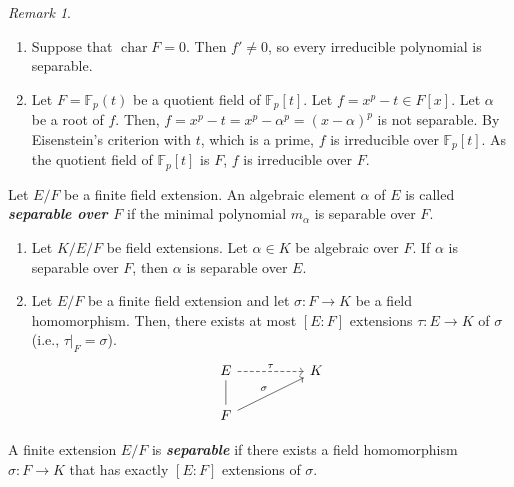 \documentclass[twoside]{article}
\DeclareMathOperator\Char{char}
\newcommand\F{\mathbb F}
\theoremstyle{remark}
\newtheorem*{remark}{{Remark}}
\newcounter{theorem}
\newcommand*\term[1]{\textbf{\textit{\mathversion{bold}#1}}}
\begin{document}
\begin{remark}
  \begin{enumerate}[label=(\arabic*)]
    \item Suppose that \(\Char F = 0\). Then \(f' \neq 0\), so every irreducible polynomial is separable.
    \item Let \(F = \F_p(t)\) be a quotient field of \(\F_p[t]\). Let \(f = x^p-t \in F[x]\). Let \(\alpha\) be a root of \(f\). Then, \(f = x^p - t = x^p - \alpha^p = (x-\alpha)^p\) is not separable. By Eisenstein's criterion with \(t\), which is a prime, \(f\) is irreducible over \(\F_p[t]\). As the quotient field of \(\F_p[t]\) is \(F\), \(f\) is irreducible over \(F\).
  \end{enumerate}
\end{remark}

\begin{definition}
  Let \(E/F\) be a finite field extension. An algebraic element \(\alpha\) of \(E\) is called \term{separable over \(F\)} if the minimal polynomial \(m_\alpha\) is separable over \(F\).
\end{definition}

\begin{lemma}
  \begin{enumerate}[label=\textup{(\arabic*)}, nosep]
    \item Let \(K/E/F\) be field extensions. Let \(\alpha \in K\) be algebraic over \(F\). If \(\alpha\) is separable over \(F\), then \(\alpha\) is separable over \(E\).
    \item Let \(E/F\) be a finite field extension and let \(\sigma\colon F \to K\) be a field homomorphism. Then, there exists at most \([E:F]\) extensions \(\tau\colon E \to K\) of \(\sigma\) (i.e., \(\tau|_F = \sigma\)).
    \begin{displaymath}
      \begin{tikzcd}[column sep=huge]
        E\rar[dashed,"\tau"]\dar[dash] & K \\
        F\arrow[ur,"\sigma"]
      \end{tikzcd}
    \end{displaymath}
  \end{enumerate}
\end{lemma}

\begin{definition}
  A finite extension \(E/F\) is \term{separable} if there exists a field homomorphism \(\sigma\colon F \to K\) that has exactly \([E:F]\) extensions of \(\sigma\).
\end{definition}
\end{document}
